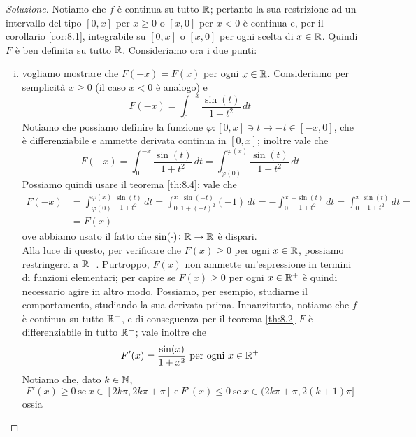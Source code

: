 \begin{proof}[Soluzione]
    Notiamo che $f$ è continua su tutto $\amsbb{R}$; pertanto la sua restrizione ad un intervallo del tipo $[0,x]$ per $x\ge 0$ o $[x,0]$ per $x<0$ è continua e, per il corollario \ref{cor:8.1}, integrabile su $[0,x]$ o $[x,0]$ per ogni scelta di $x\in\amsbb{R}$. Quindi $F$ è ben definita su tutto $\amsbb{R}$. Consideriamo ora i due punti:
    \begin{enumerate}[(i)]
        \item vogliamo mostrare che $F(-x) = F(x)$ per ogni $x\in\amsbb{R}$. Consideriamo per semplicità $x\ge 0$ (il caso $x<0$ è analogo) e
        \[
        F(-x) = \int_0^{-x} \frac{\sin(t)}{1+t^2}\, dt
        \]
        Notiamo che possiamo definire la funzione $\varphi\colon [0,x]\ni t\mapsto  -t\in [-x,0]$, che è differenziabile e ammette derivata continua in $[0,x]$; inoltre vale che
        \[
        F(-x) = \int_0^{-x}\frac{\sin(t)}{1+t^2}\, dt = \int_{\varphi(0)}^{\varphi(x)}\frac{\sin(t)}{1+t^2}\, dt
        \]
        Possiamo quindi usare il teorema \ref{th:8.4}: vale che
        \[
        \begin{split}
            F(-x) & = \int_{\varphi(0)}^{\varphi(x)}\frac{\sin(t)}{1+t^2}\, dt = \int_0^x \frac{\sin(-t)}{1+(-t)^2}(-1)\, dt = -\int_0^x \frac{-\sin(t)}{1+t^2}\, dt = \int_0^x \frac{\sin(t)}{1+t^2}\, dt = \\
            & = F(x)
        \end{split}
        \]
        ove abbiamo usato il fatto che $\sin(\cdot)\colon\amsbb{R}\to\amsbb{R}$ è dispari.\\
        Alla luce di questo, per verificare che $F(x)\ge 0$ per ogni $x\in\amsbb{R}$, possiamo restringerci a $\amsbb{R}^+$. Purtroppo, $F(x)$ non ammette un'espressione in termini di funzioni elementari; per capire se $F(x)\ge 0$ per ogni $x\in\amsbb{R}^+$ è quindi necessario agire in altro modo. Possiamo, per esempio, studiarne il comportamento, studiando la sua derivata prima. Innanzitutto, notiamo che $f$ è continua su tutto $\amsbb{R}^+$, e di conseguenza per il teorema \ref{th:8.2} $F$ è differenziabile in tutto $\amsbb{R}^+$; vale inoltre che
        \[
        F'(x) = \frac{\sin(x)}{1+x^2} \ \text{per ogni} \ x\in\amsbb{R}^+
        \]
        Notiamo che, dato $k\in\amsbb{N}$,
        \[
        F'(x)\ge 0 \ \text{se} \ x\in[2k\pi, 2k\pi + \pi] \ \text{e} \ F'(x)\le 0 \ \text{se} \ x\in(2k\pi+\pi, 2(k+1)\pi]
        \]
        ossia
        \begin{center}
            \begin{tikzpicture}

\end{tikzpicture}
\end{center}
\end{enumerate}
\end{proof}
